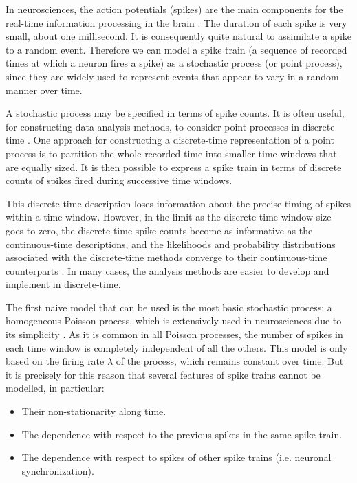 \documentclass{article}
\begin{document}
In neurosciences, the action potentials (spikes) are the main components for the real-time information processing in the brain \citep{Eden}. 
The duration of each spike is very small, about one millisecond. 
It is consequently quite natural to assimilate a spike to a random event. 
Therefore we can model a spike train (a sequence of recorded times at which a neuron fires a spike) as a stochastic process (or point process), since they are widely used to represent events that appear to vary in a random manner over time.

A stochastic process may be specified in terms of spike counts. 
It is often useful, for constructing data analysis methods, to consider point processes in discrete time \citep{Eden}. 
One approach for constructing a discrete-time representation of a point process is to partition the whole recorded time into smaller time windows that are equally sized. 
It is then possible to express a spike train in terms of discrete counts of spikes fired during successive time windows. 

This discrete time description loses information about the precise timing of spikes within a time window. 
However, in the limit as the discrete-time window size goes to zero, the discrete-time spike counts become as informative as the continuous-time descriptions, and the likelihoods and probability distributions associated with the discrete-time methods converge to their continuous-time counterparts \citep{Eden}. 
In many cases, the analysis methods are easier to develop and implement in discrete-time.    

The first naive model that can be used is the most basic stochastic process: a homogeneous Poisson process, which is extensively used in neurosciences due to its simplicity \citep{Gerstner}. 
As it is common in all Poisson processes, the number of spikes in each time window is completely independent of all the others. 
This model is only based on the firing rate \begin{math}\lambda\end{math} of the process, which remains constant over time. 
But it is precisely for this reason that several features of spike trains cannot be modelled, in particular: 

\begin{itemize}
    \item Their non-stationarity along time.
    \item The dependence with respect to the previous spikes in the same spike train.
    \item The dependence with respect to spikes of other spike trains (i.e. neuronal synchronization).
\end{itemize}
\end{document}
